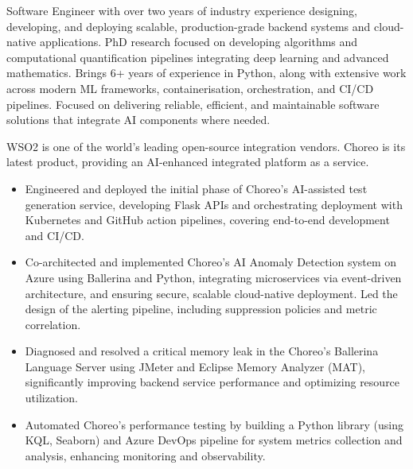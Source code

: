 \documentclass[12pt,a4paper,withhyper]{altacv}
\begin{document}


\makecvheader{}

\medskip


Software Engineer with over two years of industry experience designing, developing, and deploying scalable, production-grade backend systems and cloud-native applications. PhD research focused on developing algorithms and computational quantification pipelines integrating deep learning and advanced mathematics. Brings 6+ years of experience in Python, along with extensive work across modern ML frameworks, containerisation, orchestration, and CI/CD pipelines. Focused on delivering reliable, efficient, and maintainable software solutions that integrate AI components where needed.

\medskip


WSO2 is one of the world's leading open-source integration vendors. Choreo is its latest product, providing an AI-enhanced integrated platform as a service.
\medskip

\begin{itemize}
\item Engineered and deployed the initial phase of Choreo's AI-assisted test generation service, developing Flask APIs and orchestrating deployment with Kubernetes and GitHub action pipelines, covering end-to-end development and CI/CD.
\item Co-architected and implemented Choreo’s AI Anomaly Detection system on Azure using Ballerina and Python, integrating microservices via event-driven architecture, and ensuring secure, scalable cloud-native deployment. Led the design of the alerting pipeline, including suppression policies and metric correlation.
\item Diagnosed and resolved a critical memory leak in the Choreo's Ballerina Language Server using JMeter and Eclipse Memory Analyzer (MAT), significantly improving backend service performance and optimizing resource utilization.
\item Automated Choreo’s performance testing by building a Python library (using KQL, Seaborn) and Azure DevOps pipeline for system metrics collection and analysis, enhancing monitoring and observability.
\end{itemize}
\end{document}
